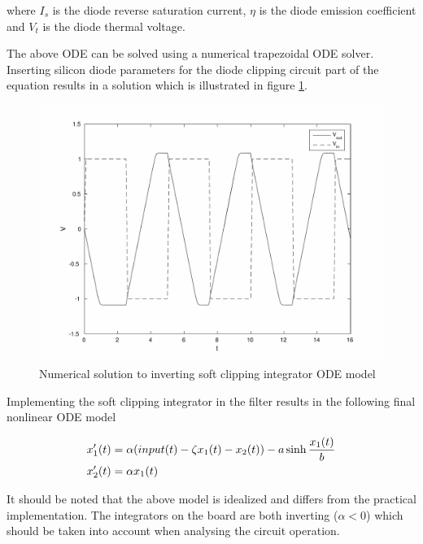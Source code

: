 \documentclass{article}
\begin{document}
where $I_s$ is the diode reverse saturation current, $\eta$ is the diode emission coefficient and $V_{t}$ is the diode thermal voltage.\newline

The above ODE can be solved using a numerical trapezoidal ODE solver. Inserting silicon diode parameters for the diode clipping circuit part of the equation results in a solution which is illustrated in figure \ref{fig:integrator}. \newline

\begin{figure}[H]\centering
  \includegraphics[page=1, scale=0.58]{inverting_clipping_integrator2.pdf}
  \caption{Numerical solution to inverting soft clipping integrator ODE model}
  \label{fig:integrator}
\end{figure}

Implementing the soft clipping integrator in the filter results in the following final nonlinear ODE model 

\begin{align}
\begin{split}
x_{1}'(t) &= \alpha \space (input(t) - \zeta \space x_{1}(t) - x_{2}(t)) - a \space \sinh \frac{x_{1}(t)}{b} \\
x_{2}'(t) &= \alpha \space x_{1}(t) \\
\end{split}
\end{align}

It should be noted that the above model is idealized and differs from the practical implementation. The integrators on the board are both inverting ($\alpha < 0$) which should be taken into account when analysing the circuit operation. \newline
\end{document}
